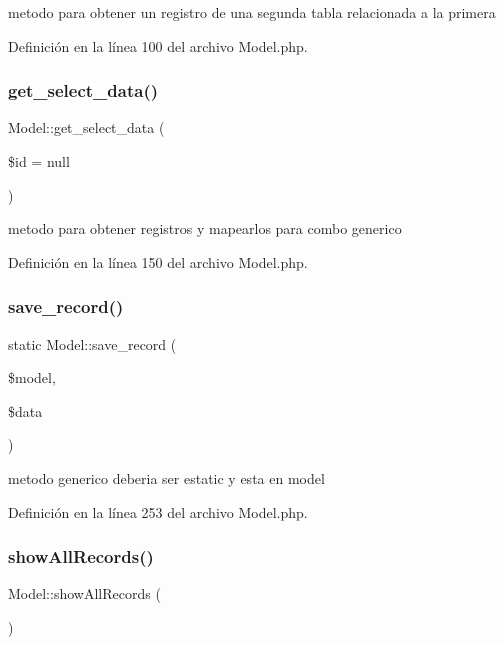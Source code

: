 metodo para obtener un registro de una segunda tabla relacionada a la primera 

Definición en la línea 100 del archivo Model.\+php.

\mbox{\label{class_model_a85f2794443673870da8d4e34e1e3a307}} 
\subsubsection{\texorpdfstring{get\_select\_data()}{get\_select\_data()}}
{\footnotesize\ttfamily Model\+::get\+\_\+select\+\_\+data (\begin{DoxyParamCaption}\item[{}]{\$id = {\ttfamily null} }\end{DoxyParamCaption})}

metodo para obtener registros y mapearlos para combo generico 

Definición en la línea 150 del archivo Model.\+php.

\mbox{\label{class_model_a740d72b25fc3721184b8e304ab1d5c50}} 
\subsubsection{\texorpdfstring{save\_record()}{save\_record()}}
{\footnotesize\ttfamily static Model\+::save\+\_\+record (\begin{DoxyParamCaption}\item[{}]{\$model,  }\item[{}]{\$data }\end{DoxyParamCaption})\hspace{0.3cm}{\ttfamily [static]}}

metodo generico deberia ser estatic y esta en model 

Definición en la línea 253 del archivo Model.\+php.

\mbox{\label{class_model_a7b1ac1e4fdca6e471ad62e21416c9ee7}} 
\subsubsection{\texorpdfstring{showAllRecords()}{showAllRecords()}}
{\footnotesize\ttfamily Model\+::show\+All\+Records (\begin{DoxyParamCaption}{ }\end{DoxyParamCaption})}

